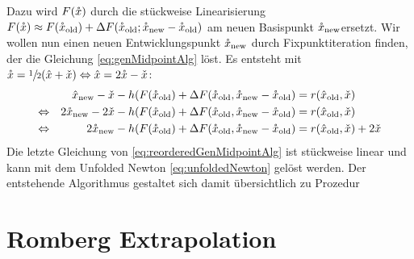 Dazu wird $F(\mathring{x})$ durch die stückweise Linearisierung $F(\mathring{x})\approx F(\mathring{x}_{\text{old}})+\Delta F(\mathring{x}_{\text{old}};\mathring{x}_{\text{new}} -\mathring{x}_{\text{old}} )$ am neuen Basispunkt $\mathring{x}_{\text{new}}$ersetzt. 
Wir wollen nun einen neuen Entwicklungspunkt $\mathring{x}_{\text{new}}$ durch Fixpunktiteration finden, der die Gleichung \eqref{eq:genMidpointAlg} löst. 
Es entsteht mit $\mathring{x} = \sfrac{1}{2} (\hat x + \check x) \Leftrightarrow \hat x = 2\mathring{x} - \check x$:
\begin{equation}
\label{eq:reorderedGenMidpointAlg}
 \begin{aligned}
		 && \hat x_{\text{new}} - \check x - h (F(\mathring{x}_{\text{old}}) +\Delta F(\mathring{x}_{\text{old}},\mathring{x}_{\text{new}} - \mathring{x}_{\text{old}}) &= r(\hat x_{\text{old}},\check x)\\
 \Leftrightarrow && 2\mathring{x}_{\text{new}} - 2\check x - h (F(\mathring{x}_{\text{old}}) +\Delta F(\mathring{x}_{\text{old}},\mathring{x}_{\text{new}} - \mathring{x}_{\text{old}}) &= r(\hat x_{\text{old}},\check x)\\
 \Leftrightarrow && 2\mathring{x}_{\text{new}} -  h (F(\mathring{x}_{\text{old}}) +\Delta F(\mathring{x}_{\text{old}},\mathring{x}_{\text{new}} - \mathring{x}_{\text{old}}) &= r(\hat x_{\text{old}},\check x) + 2\check x
 \end{aligned}
\end{equation}
Die letzte Gleichung von \eqref{eq:reorderedGenMidpointAlg} ist stückweise linear und kann mit dem Unfolded Newton \eqref{eq:unfoldedNewton} gelöst werden. Der entstehende Algorithmus gestaltet sich damit übersichtlich zu Prozedur 



\section{Romberg Extrapolation}
\cite{boeck14}
